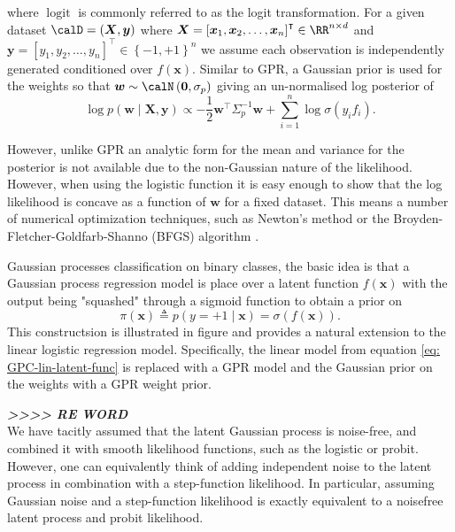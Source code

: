 where $\operatorname{logit}$ is commonly referred to as the logit transformation. For a given dataset $\calD = \left( \bm{X} , \bm{y} \right)$ where $\bm{X} = \left[ \bm{x}_1 , \bm{x}_2 , \ldots , \bm{x}_n \right]^{\intercal} \in \RR^{n \times d}$ and $\bm{y} = \left[ y_1 , y_2 , \ldots , y_n \right]^{\intercal} \in \left\{ -1,+1 \right\}^{n}$ we assume each observation is independently generated conditioned over $f \left( \bm{x} \right)$. Similar to GPR, a Gaussian prior is used for the weights so that $\bm{w} \sim \calN \left( \bm{0} , \sigma_p \right)$ giving an un-normalised log posterior of
\begin{equation*}
    \log p \left( \bm{w} \mid \bm{X} , \bm{y} \right) \propto - \frac{1}{2} \bm{w}^{\intercal} \Sigma_p^{-1} \bm{w} + \sum_{i=1}^{n} \log \sigma \left( y_i f_i \right).
\end{equation*}

However, unlike GPR an analytic form for the mean and variance for the posterior is not available due to the non-Gaussian nature of the likelihood. However, when using the logistic function it is easy enough to show that the log likelihood is concave as a function of $\bm{w}$ for a fixed dataset. This means a number of numerical optimization techniques, such as Newton's method or the Broyden-Fletcher-Goldfarb-Shanno (BFGS) algorithm \cite{FletcherR2000PMoO}.

Gaussian processes classification on binary classes, the basic idea is that a Gaussian process regression model is place over a latent function $f \left( \bm{x} \right)$ with the output being "squashed" through a sigmoid function to obtain a prior on
\begin{equation*}
    \pi \left( \bm{x} \right) \triangleq p \left( y=+1 \mid \bm{x} \right) = \sigma \left( f \left( \bm{x} \right) \right).
\end{equation*}
This constructsion is illustrated in figure and provides a natural extension to the linear logistic regression model. Specifically, the linear model from equation \ref{eq: GPC-lin-latent-func} is replaced with a GPR model and the Gaussian prior on the weights with a GPR weight prior.

    {\em \textbf{>>>> RE WORD}}\\
We have tacitly assumed that the latent Gaussian process is noise-free, and
combined it with smooth likelihood functions, such as the logistic or probit.
However, one can equivalently think of adding independent noise to the latent
process in combination with a step-function likelihood. In particular, assuming
Gaussian noise and a step-function likelihood is exactly equivalent to a noisefree
latent process and probit likelihood.

